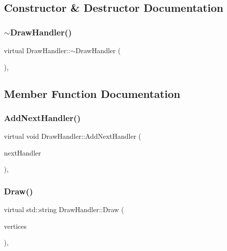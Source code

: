 \subsection{Constructor \& Destructor Documentation}
\mbox{\label{class_draw_handler_a631712b3bd0cdbf327065194c5cf46f5}} 
\subsubsection{\texorpdfstring{$\sim$DrawHandler()}{~DrawHandler()}}
{\footnotesize\ttfamily virtual Draw\+Handler\+::$\sim$\+Draw\+Handler (\begin{DoxyParamCaption}{ }\end{DoxyParamCaption})\hspace{0.3cm}{\ttfamily [inline]}, {\ttfamily [virtual]}}



\subsection{Member Function Documentation}
\mbox{\label{class_draw_handler_ac579261b9482644c32b162b1cd2e6780}} 
\subsubsection{\texorpdfstring{AddNextHandler()}{AddNextHandler()}}
{\footnotesize\ttfamily virtual void Draw\+Handler\+::\+Add\+Next\+Handler (\begin{DoxyParamCaption}\item[{\mbox{\hyperlink{class_draw_handler}{Draw\+Handler}} $\ast$}]{next\+Handler }\end{DoxyParamCaption})\hspace{0.3cm}{\ttfamily [inline]}, {\ttfamily [virtual]}}

\mbox{\label{class_draw_handler_af52aafccdd1397441a17a2d36174a1e4}} 
\subsubsection{\texorpdfstring{Draw()}{Draw()}}
{\footnotesize\ttfamily virtual std\+::string Draw\+Handler\+::\+Draw (\begin{DoxyParamCaption}\item[{int}]{vertices }\end{DoxyParamCaption})\hspace{0.3cm}{\ttfamily [inline]}, {\ttfamily [virtual]}}



